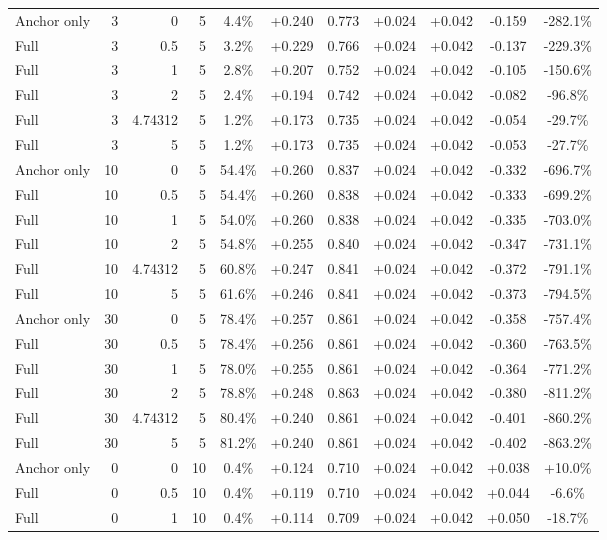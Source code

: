 \begin{table}[htbp]
\begin{tabular}{lrrrccccccc}
Anchor only & 3 & 0 & 5 & 4.4\% & +0.240 & 0.773 & +0.024 & +0.042 & -0.159 & -282.1\% \\
Full & 3 & 0.5 & 5 & 3.2\% & +0.229 & 0.766 & +0.024 & +0.042 & -0.137 & -229.3\% \\
Full & 3 & 1 & 5 & 2.8\% & +0.207 & 0.752 & +0.024 & +0.042 & -0.105 & -150.6\% \\
Full & 3 & 2 & 5 & 2.4\% & +0.194 & 0.742 & +0.024 & +0.042 & -0.082 & -96.8\% \\
Full & 3 & 4.74312 & 5 & 1.2\% & +0.173 & 0.735 & +0.024 & +0.042 & -0.054 & -29.7\% \\
Full & 3 & 5 & 5 & 1.2\% & +0.173 & 0.735 & +0.024 & +0.042 & -0.053 & -27.7\% \\
Anchor only & 10 & 0 & 5 & 54.4\% & +0.260 & 0.837 & +0.024 & +0.042 & -0.332 & -696.7\% \\
Full & 10 & 0.5 & 5 & 54.4\% & +0.260 & 0.838 & +0.024 & +0.042 & -0.333 & -699.2\% \\
Full & 10 & 1 & 5 & 54.0\% & +0.260 & 0.838 & +0.024 & +0.042 & -0.335 & -703.0\% \\
Full & 10 & 2 & 5 & 54.8\% & +0.255 & 0.840 & +0.024 & +0.042 & -0.347 & -731.1\% \\
Full & 10 & 4.74312 & 5 & 60.8\% & +0.247 & 0.841 & +0.024 & +0.042 & -0.372 & -791.1\% \\
Full & 10 & 5 & 5 & 61.6\% & +0.246 & 0.841 & +0.024 & +0.042 & -0.373 & -794.5\% \\
Anchor only & 30 & 0 & 5 & 78.4\% & +0.257 & 0.861 & +0.024 & +0.042 & -0.358 & -757.4\% \\
Full & 30 & 0.5 & 5 & 78.4\% & +0.256 & 0.861 & +0.024 & +0.042 & -0.360 & -763.5\% \\
Full & 30 & 1 & 5 & 78.0\% & +0.255 & 0.861 & +0.024 & +0.042 & -0.364 & -771.2\% \\
Full & 30 & 2 & 5 & 78.8\% & +0.248 & 0.863 & +0.024 & +0.042 & -0.380 & -811.2\% \\
Full & 30 & 4.74312 & 5 & 80.4\% & +0.240 & 0.861 & +0.024 & +0.042 & -0.401 & -860.2\% \\
Full & 30 & 5 & 5 & 81.2\% & +0.240 & 0.861 & +0.024 & +0.042 & -0.402 & -863.2\% \\
Anchor only & 0 & 0 & 10 & 0.4\% & +0.124 & 0.710 & +0.024 & +0.042 & +0.038 & +10.0\% \\
Full & 0 & 0.5 & 10 & 0.4\% & +0.119 & 0.710 & +0.024 & +0.042 & +0.044 & -6.6\% \\
Full & 0 & 1 & 10 & 0.4\% & +0.114 & 0.709 & +0.024 & +0.042 & +0.050 & -18.7\% \\

\end{tabular}
\end{table}
